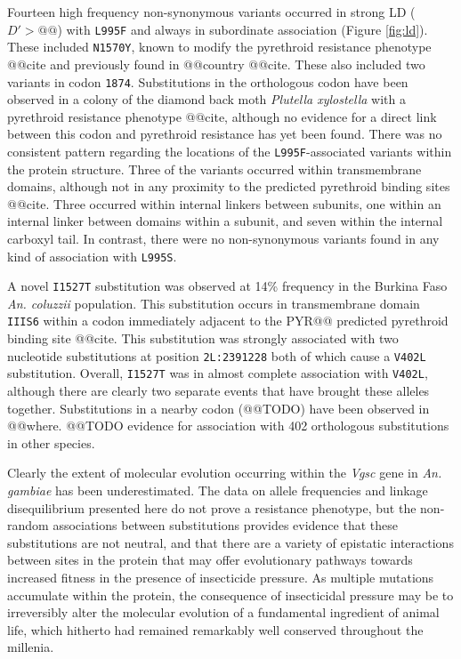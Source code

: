 \documentclass[a4paper,11pt,abstracton,hidelinks]{scrartcl}
\newcommand{\agam}{\textit{An. gambiae}\xspace}
\newcommand{\acol}{\textit{An. coluzzii}\xspace}
\newcommand{\vgsc}{\textit{Vgsc}\xspace}
\begin{document}
Fourteen high frequency non-synonymous variants occurred in strong LD ($D' > @@$) with \texttt{L995F} and always in subordinate association (Figure \ref{fig:ld}). 
%
These included \texttt{N1570Y}, known to modify the pyrethroid resistance phenotype @@cite and previously found in @@country @@cite.
%
These also included two variants in codon \texttt{1874}.
%
Substitutions in the orthologous codon have been observed in a colony of the diamond back moth \textit{Plutella xylostella} with a pyrethroid resistance phenotype @@cite, although no evidence for a direct link between this codon and pyrethroid resistance has yet been found.
%
There was no consistent pattern regarding the locations of the \texttt{L995F}-associated variants within the protein structure.
%
Three of the variants occurred within transmembrane domains, although not in any proximity to the predicted pyrethroid binding sites @@cite.
%
Three occurred within internal linkers between subunits, one within an internal linker between domains within a subunit, and seven within the internal carboxyl tail.
%
In contrast, there were no non-synonymous variants found in any kind of association with \texttt{L995S}.


A novel \texttt{I1527T} substitution was observed at 14\% frequency in the Burkina Faso \acol population.
%
This substitution occurs in transmembrane domain \texttt{IIIS6} within a codon immediately adjacent to the PYR@@ predicted pyrethroid binding site @@cite.
%
This substitution was strongly associated with two nucleotide substitutions at position \texttt{2L:2391228} both of which cause a \texttt{V402L} substitution.
%
Overall, \texttt{I1527T} was in almost complete association with \texttt{V402L}, although there are clearly two separate events that have brought these alleles together.
%
Substitutions in a nearby codon (@@TODO) have been observed in @@where.
%
@@TODO evidence for association with 402 orthologous substitutions in other species.


Clearly the extent of molecular evolution occurring within the \vgsc gene in \agam has been underestimated.
%
The data on allele frequencies and linkage disequilibrium presented here do not prove a resistance phenotype, but the non-random associations between substitutions provides evidence that these substitutions are not neutral, and that there are a variety of epistatic interactions between sites in the protein that may offer evolutionary pathways towards increased fitness in the presence of insecticide pressure.
%
As multiple mutations accumulate within the protein, the consequence of insecticidal pressure may be to irreversibly alter the molecular evolution of a fundamental ingredient of animal life, which hitherto had remained remarkably well conserved throughout the millenia.
\end{document}
